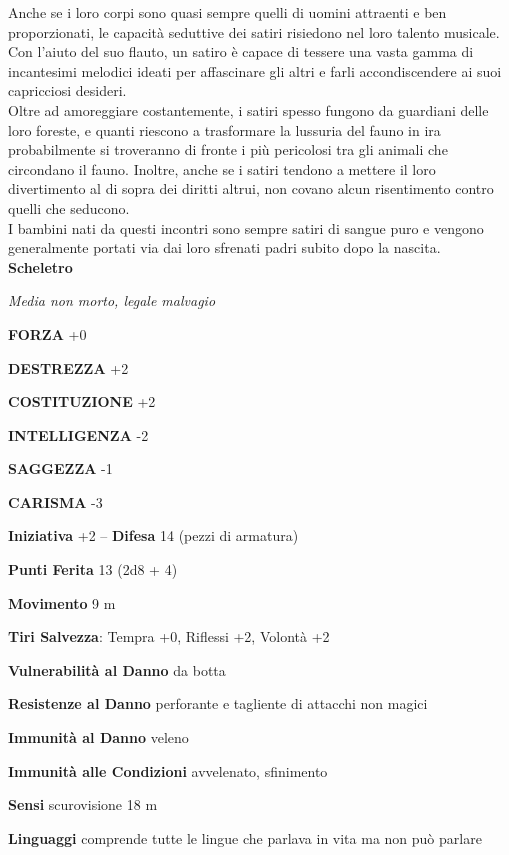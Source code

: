 \begin{multicols}{2}
Anche se i loro corpi sono quasi sempre quelli di uomini attraenti e ben proporzionati, le capacità seduttive dei satiri risiedono nel loro talento musicale. Con l'aiuto del suo flauto, un satiro è capace di tessere una vasta gamma di incantesimi melodici ideati per affascinare gli altri e farli accondiscendere ai suoi capricciosi desideri.\\

Oltre ad amoreggiare costantemente, i satiri spesso fungono da guardiani delle loro foreste, e quanti riescono a trasformare la lussuria del fauno in ira probabilmente si troveranno di fronte i più pericolosi tra gli animali che circondano il fauno. Inoltre, anche se i satiri tendono a mettere il loro divertimento al di sopra dei diritti altrui, non covano alcun risentimento contro quelli che seducono.\\

I bambini nati da questi incontri sono sempre satiri di sangue puro e vengono generalmente portati via dai loro sfrenati padri subito dopo la nascita.\\


\medskip{}\textbf{Scheletro}

\emph{Media non morto, legale malvagio}

\textbf{FORZA} +0

\textbf{DESTREZZA} +2

\textbf{COSTITUZIONE} +2

\textbf{INTELLIGENZA} -2

\textbf{SAGGEZZA} -1

\textbf{CARISMA} -3

\textbf{Iniziativa} +2 -- \textbf{Difesa} 14 (pezzi di armatura)

\textbf{Punti Ferita} 13 (2d8 + 4)

\textbf{Movimento} 9 m

\textbf{Tiri Salvezza}: Tempra +0, Riflessi +2, Volontà +2

\textbf{Vulnerabilità al Danno} da botta

\textbf{Resistenze al Danno} perforante e tagliente di attacchi non magici

\textbf{Immunità al Danno} veleno

\textbf{Immunità alle Condizioni} avvelenato, sfinimento

\textbf{Sensi} scurovisione 18 m

\textbf{Linguaggi} comprende tutte le lingue che parlava in vita ma non può parlare


\end{multicols}
